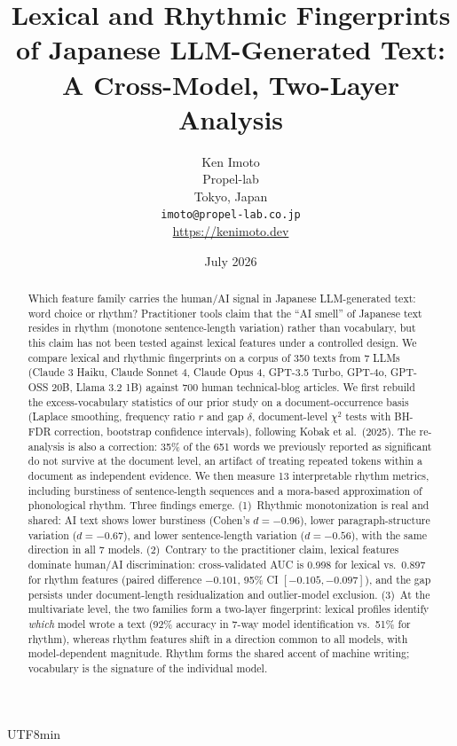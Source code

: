 \documentclass[11pt,a4paper]{article}
\title{Lexical and Rhythmic Fingerprints of Japanese LLM-Generated Text:\\A Cross-Model, Two-Layer Analysis}
\author{Ken Imoto\\Propel-lab\\Tokyo, Japan\\\texttt{imoto@propel-lab.co.jp}\\\url{https://kenimoto.dev}}
\date{July 2026}
\begin{document}
\begin{CJK}{UTF8}{min}

\maketitle

\begin{abstract}
Which feature family carries the human/AI signal in Japanese LLM-generated text: word choice or rhythm? Practitioner tools claim that the ``AI smell'' of Japanese text resides in rhythm (monotone sentence-length variation) rather than vocabulary, but this claim has not been tested against lexical features under a controlled design. We compare lexical and rhythmic fingerprints on a corpus of 350 texts from 7 LLMs (Claude 3 Haiku, Claude Sonnet 4, Claude Opus 4, GPT-3.5 Turbo, GPT-4o, GPT-OSS 20B, Llama 3.2 1B) against 700 human technical-blog articles. We first rebuild the excess-vocabulary statistics of our prior study on a document-occurrence basis (Laplace smoothing, frequency ratio $r$ and gap $\delta$, document-level $\chi^2$ tests with BH-FDR correction, bootstrap confidence intervals), following Kobak et al.\ (2025). The re-analysis is also a correction: 35\% of the 651 words we previously reported as significant do not survive at the document level, an artifact of treating repeated tokens within a document as independent evidence. We then measure 13 interpretable rhythm metrics, including burstiness of sentence-length sequences and a mora-based approximation of phonological rhythm. Three findings emerge. (1)~Rhythmic monotonization is real and shared: AI text shows lower burstiness (Cohen's $d=-0.96$), lower paragraph-structure variation ($d=-0.67$), and lower sentence-length variation ($d=-0.56$), with the same direction in all 7 models. (2)~Contrary to the practitioner claim, lexical features dominate human/AI discrimination: cross-validated AUC is 0.998 for lexical vs.\ 0.897 for rhythm features (paired difference $-0.101$, 95\% CI $[-0.105, -0.097]$), and the gap persists under document-length residualization and outlier-model exclusion. (3)~At the multivariate level, the two families form a two-layer fingerprint: lexical profiles identify \emph{which} model wrote a text (92\% accuracy in 7-way model identification vs.\ 51\% for rhythm), whereas rhythm features shift in a direction common to all models, with model-dependent magnitude. Rhythm forms the shared accent of machine writing; vocabulary is the signature of the individual model.
\end{abstract}


\end{CJK}
\end{document}
